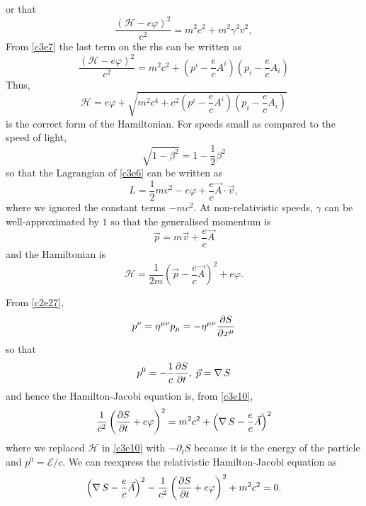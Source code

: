 \begin{enumerate}
\[\]
or that
\[
\frac{(\mathcal{H} - e\varphi)^2}{c^2} = m^2c^2 + m^2\gamma^2 v^2,
\]
From \eqref{c3e7} the last term on the rhs can be written as
\begin{equation}\label{c3e10}
\frac{(\mathcal{H} - e\varphi)^2}{c^2} = m^2c^2 + 
\left(p^i - \frac{e}{c}A^i\right)
\left(p_i - \frac{e}{c}A_i\right)
\end{equation}
Thus,
\begin{equation}\label{c3e11}
\mathcal{H} = e\varphi + \sqrt{m^2c^4 + c^2 
\left(p^i - \frac{e}{c}A^i\right)\left(p_i - \frac{e}{c}A_i\right)}
\end{equation}
is the correct form of the Hamiltonian. For speeds small as compared to the
speed of light,
\[
\sqrt{1 - \beta^2} = 1 - \frac{1}{2}\beta^2
\]
so that the Lagrangian of \eqref{c3e6} can be written as
\begin{equation}\label{c3e12}
L = \frac{1}{2}mv^2 - e\varphi + \frac{e}{c}\vec{A}\cdot\vec{v},
\end{equation}
where we ignored the constant terms $-mc^2$. At non-relativistic speeds, 
$\gamma$ can be well-approximated by $1$ so that the generalised momentum is
\begin{equation}\label{c3e13}
\vec{p} = m\vec{v} + \frac{e}{c}\vec{A}
\end{equation}
and the Hamiltonian is
\begin{equation}\label{c3e14}
\mathcal{H} = \frac{1}{2m}\left(\vec{p} - \frac{e}{c}\vec{A}\right)^2 + 
e\varphi.
\end{equation}

From \eqref{c2e27},
\[
p^\nu = \eta^{\mu\nu}p_\mu = -\eta^{\mu\nu}\frac{\partial{S}}{\partial{x^\mu}}
\]
so that
\[
p^0 = -\frac{1}{c}\frac{\partial{S}}{\partial{t}},\;\vec{p} = \operatorname{\nabla} S
\]
and hence the Hamilton-Jacobi equation is, from \eqref{c3e10},
\[
\frac{1}{c^2}\left(\frac{\partial{S}}{\partial{t}} + e\varphi\right)^2 = m^2c^2 + 
\left(\operatorname{\nabla} S - \frac{e}{c}\vec{A}\right)^2
\]
where we replaced $\mathcal{H}$ in \eqref{c3e10} with $-\partial_t S$ 
because it is the energy of the particle and $p^0 = \mathcal{E}/c$. We can 
reexpress the relativistic Hamilton-Jacobi equation as 
\begin{equation}\label{c3e15}
\left(\operatorname{\nabla} S - \frac{e}{c}\vec{A}\right)^2 - 
\frac{1}{c^2}\left(\frac{\partial{S}}{\partial{t}} + e\varphi\right)^2 + m^2c^2 = 0.
\end{equation}


\end{enumerate}
